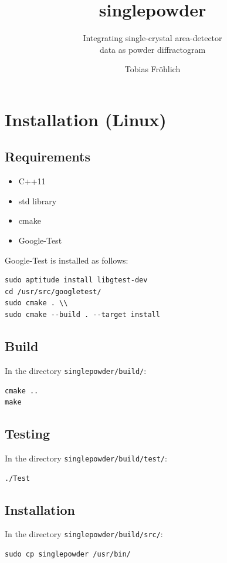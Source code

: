 \documentclass[a4paper, 12pt, twoside]{scrartcl}
\title{singlepowder}
\subtitle{Integrating single-crystal area-detector\\data as powder diffractogram}
\author{Tobias Fr\"{o}hlich}
\date{}
\begin{document}
\maketitle

\section{Installation (Linux)}


\subsection{Requirements}

\begin{itemize}
	\item C++11
	\item std library
	\item cmake
	\item Google-Test
\end{itemize}

Google-Test is installed as follows:

\begin{verbatim}
sudo aptitude install libgtest-dev
cd /usr/src/googletest/
sudo cmake . \\
sudo cmake --build . --target install
\end{verbatim}

\subsection{Build}
In the directory \verb|singlepowder/build/|:\\
\begin{verbatim}
cmake ..
make
\end{verbatim}

\subsection{Testing}
In the directory \verb|singlepowder/build/test/|:\\
\begin{verbatim}
./Test
\end{verbatim}

\subsection{Installation}
In the directory \verb|singlepowder/build/src/|:\\
\begin{verbatim}
sudo cp singlepowder /usr/bin/
\end{verbatim}
\end{document}
